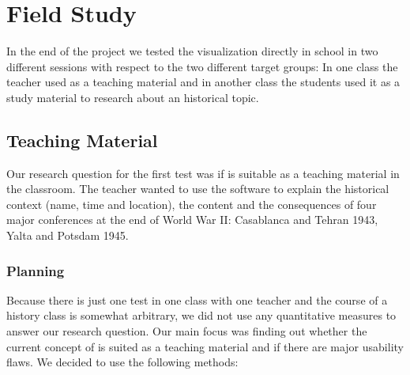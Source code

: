 \section{Field Study} %
\label{sec:field_study}

In the end of the project we tested the visualization directly in school in two different sessions with respect to the two different target groups: In one class the teacher used \HG as a teaching material and in another class the students used it as a study material to research about an historical topic.

\subsection{Teaching Material} %
\label{sub:usage_as_teaching_material}

Our research question for the first test was if \HG is suitable as a teaching material in the classroom. The teacher wanted to use the software to explain the historical context (name, time and location), the content and the consequences of four major conferences at the end of World War II: Casablanca and Tehran 1943, Yalta and Potsdam 1945.

\subsubsection{Planning} %
\label{ssub:planning-1}


Because there is just one test in one class with one teacher and the course of a history class is somewhat arbitrary, we did not use any quantitative measures to answer our research question. Our main focus was finding out whether the current concept of \HG is suited as a teaching material and if there are major usability flaws. We decided to use the following methods:

